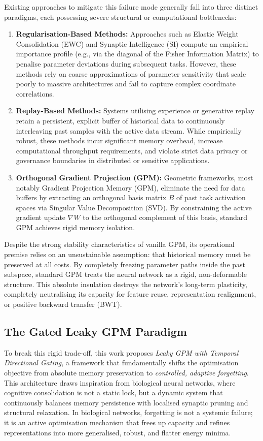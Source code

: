 \documentclass[10pt,a4paper]{article}
\begin{document}
	Existing approaches to mitigate this failure mode generally fall into three distinct paradigms, each possessing severe structural or computational bottlenecks:
	\begin{enumerate}
		\item \textbf{Regularisation-Based Methods:} Approaches such as Elastic Weight Consolidation (EWC) and Synaptic Intelligence (SI) compute an empirical importance profile (e.g., via the diagonal of the Fisher Information Matrix) to penalise parameter deviations during subsequent tasks. However, these methods rely on coarse approximations of parameter sensitivity that scale poorly to massive architectures and fail to capture complex coordinate correlations.
		\item \textbf{Replay-Based Methods:} Systems utilising experience or generative replay retain a persistent, explicit buffer of historical data to continuously interleaving past samples with the active data stream. While empirically robust, these methods incur significant memory overhead, increase computational throughput requirements, and violate strict data privacy or governance boundaries in distributed or sensitive applications.
		\item \textbf{Orthogonal Gradient Projection (GPM):} Geometric frameworks, most notably Gradient Projection Memory (GPM), eliminate the need for data buffers by extracting an orthogonal basis matrix $B$ of past task activation spaces via Singular Value Decomposition (SVD). By constraining the active gradient update $\nabla W$ to the orthogonal complement of this basis, standard GPM achieves rigid memory isolation. 
		\end{enumerate}
		
		Despite the strong stability characteristics of vanilla GPM, its operational premise relies on an unsustainable assumption: that historical memory must be preserved at all costs. By completely freezing parameter paths inside the past subspace, standard GPM treats the neural network as a rigid, non-deformable structure. This absolute insulation destroys the network's long-term plasticity, completely neutralising its capacity for feature reuse, representation realignment, or positive backward transfer (BWT). 
		
		\subsection{The Gated Leaky GPM Paradigm}
		
		To break this rigid trade-off, this work proposes \textit{Leaky GPM with Temporal Directional Gating}, a framework that fundamentally shifts the optimisation objective from absolute memory preservation to \textit{controlled, adaptive forgetting}. This architecture draws inspiration from biological neural networks, where cognitive consolidation is not a static lock, but a dynamic system that continuously balances memory persistence with localised synaptic pruning and structural relaxation. In biological networks, forgetting is not a systemic failure; it is an active optimisation mechanism that frees up capacity and refines representations into more generalised, robust, and flatter energy minima.
		
\end{document}
